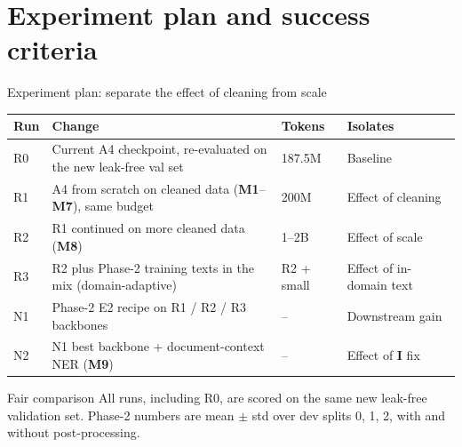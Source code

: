 \documentclass[aspectratio=169,11pt]{beamer}
\newcommand{\pb}[1]{\textbf{\textcolor{warm}{#1}}}   %
\newcommand{\mt}[1]{\textbf{\textcolor{aqua!80!black}{#1}}} %
\begin{document}
\section{Experiment plan and success criteria}

\begin{frame}{Experiment plan: separate the effect of cleaning from scale}
  \footnotesize
  \begin{tabularx}{\textwidth}{lXll}
    \toprule
    Run & Change & Tokens & Isolates \\
    \midrule
    R0 & Current A4 checkpoint, re-evaluated on the new leak-free val set & 187.5M & Baseline \\
    R1 & A4 from scratch on cleaned data (\mt{M1}--\mt{M7}), same budget & 200M & Effect of cleaning \\
    R2 & R1 continued on more cleaned data (\mt{M8}) & 1--2B & Effect of scale \\
    R3 & R2 plus Phase-2 training texts in the mix (domain-adaptive) & R2 + small & Effect of in-domain text \\
    N1 & Phase-2 E2 recipe on R1 / R2 / R3 backbones & -- & Downstream gain \\
    N2 & N1 best backbone + document-context NER (\mt{M9}) & -- & Effect of \pb{I} fix \\
    \bottomrule
  \end{tabularx}

  \vspace{3mm}
  \begin{block}{Fair comparison}
    \footnotesize
    All runs, including R0, are scored on the same new leak-free validation set. Phase-2 numbers are mean $\pm$ std over dev splits 0, 1, 2, with and without post-processing.
  \end{block}
\end{frame}
\end{document}
